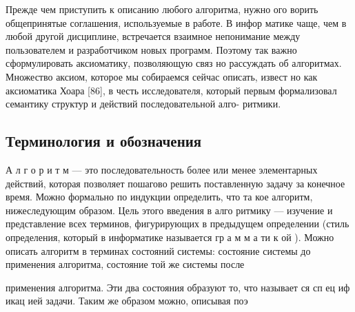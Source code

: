 \documentclass{mai_book}
\begin{document}
Прежде чем приступить к описанию любого алгоритма, нужно ого­
ворить общепринятые соглашения, используемые в работе. В инфор­
матике чаще, чем в любой другой дисциплине, встречается взаимное
непонимание между пользователем и разработчиком новых программ.
Поэтому так важно сформулировать аксиоматику, позволяющую связ­
но рассуждать об алгоритмах.
Множество аксиом, которое мы собираемся сейчас описать, извест­
но как аксиоматика Хоара [86], в честь исследователя, который первым
формализовал семантику структур и действий последовательной алго-
ритмики.

\subsection{Терминология и обозначения}

А л г о р и т м — это последовательность более или менее элементарных
действий, которая позволяет пошагово решить поставленную задачу за
конечное время. Можно формально по индукции определить, что та­
кое алгоритм, нижеследующим образом. Цель этого введения в алго­
ритмику — изучение и представление всех терминов, фигурирующих в
предыдущем определении (стиль определения, который в информатике
называется гр а м м а ти к ой ).
Можно описать алгоритм в терминах состояний системы: состояние
системы до применения алгоритма, состояние той же системы после

\pagebreak

применения алгоритма. Эти два состояния образуют то, что называет­
ся сп ец иф икац ией задачи. Таким же образом можно, описывая поэ
\end{document}
